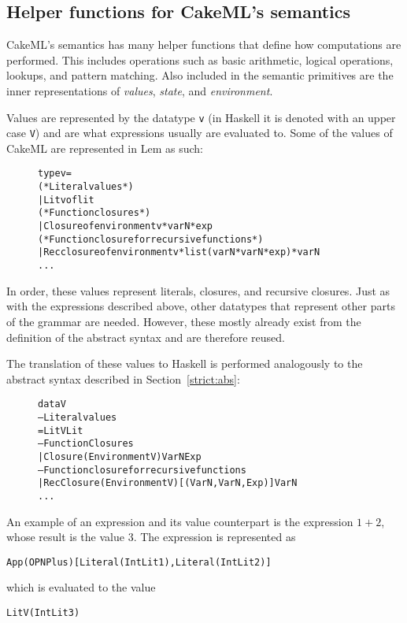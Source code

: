 \subsection{Helper functions for CakeML's semantics}
CakeML's semantics has many helper functions that define how computations are
performed. This includes operations such as basic arithmetic, logical
operations, lookups, and pattern matching. Also included in the semantic
primitives are the inner representations of \textit{values}, \textit{state}, and
\textit{environment}.

Values are represented by the datatype \texttt{v} (in Haskell it is denoted with
an upper case \texttt{V}) and are what expressions
usually are evaluated to. Some of the values of CakeML are represented in
Lem as such:

\begin{figure}[H]
\begin{alltt}
  type v =
    (* Literal values *)
    | Litv of lit
    (* Function closures *)
    | Closure of environment v * varN * exp
    (* Function closure for recursive functions *)
    | Recclosure of environment v * list (varN * varN * exp) * varN
    ...
\end{alltt}
\end{figure}

\noindent In order, these values represent literals, closures, and recursive closures.
Just as with the expressions described above, other datatypes that represent
other parts of the grammar are needed. However, these mostly already exist from
the definition of the abstract syntax and are therefore reused.

The translation of these values to Haskell is performed analogously to the
abstract syntax described in Section~\ref{strict:abs}:

\begin{figure}[H]
\begin{alltt}
  data V
    -- Literal values
    = LitV Lit
    -- Function Closures
    | Closure (Environment V) VarN Exp
    -- Function closure for recursive functions
    | RecClosure (Environment V) [(VarN, VarN, Exp)] VarN
    ...
\end{alltt}
\end{figure}

An example of an expression and its value counterpart is the expression $1 + 2$,
whose result is the value 3. The expression is represented as
\begin{alltt}
  App (OPN Plus) [Literal (IntLit 1), Literal (IntLit 2)]
\end{alltt}
which is evaluated to the value
\begin{alltt}
  LitV (IntLit 3)
\end{alltt}


